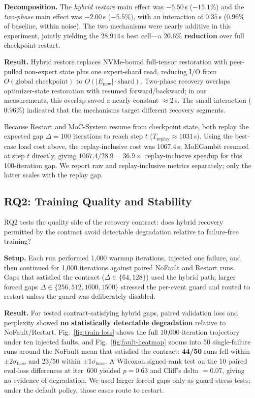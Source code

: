 \documentclass[10pt,conference]{IEEEtran}
\begin{document}
\textbf{Decomposition.} The \emph{hybrid restore} main effect was $-5.50$\,s ($-15.1\%$) and the \emph{two-phase} main effect was $-2.00$\,s ($-5.5\%$), with an interaction of $0.35$\,s ($0.96\%$ of baseline, within noise). The two mechanisms were nearly additive in this experiment, jointly yielding the $28.914$\,s best cell---a \textbf{$20.6\%$ reduction} over full checkpoint restart.

\textbf{Result.} Hybrid restore replaces NVMe-bound full-tensor restoration with peer-pulled non-expert state plus one expert-shard read, reducing I/O from $O(\text{global checkpoint})$ to $O(|E_{\text{new}}|\!\cdot\!\text{shard})$. Two-phase recovery overlaps optimizer-state restoration with resumed forward/backward; in our measurements, this overlap saved a nearly constant $\approx 2$\,s. The small interaction ($0.96\%$) indicated that the mechanisms target different recovery segments.

Because Restart and MoC-System resume from checkpoint state, both replay the expected gap $\Delta\!=\!100$ iterations to reach step $t$ ($T_{\text{replay}}\!\approx\!1031$\,s). Using the best-case load cost above, the replay-inclusive cost was $1067.4$\,s; MoEGambit resumed at step $t$ directly, giving $1067.4/28.9=\mathbf{36.9\times}$ replay-inclusive speedup for this 100-iteration gap. We report raw and replay-inclusive metrics separately; only the latter scales with the replay gap.

\subsection{RQ2: Training Quality and Stability}
\label{sec:rq2}

RQ2 tests the quality side of the recovery contract: does hybrid recovery permitted by the contract avoid detectable degradation relative to failure-free training?

\textbf{Setup.} Each run performed 1{,}000 warmup iterations, injected one failure, and then continued for 1{,}000 iterations against paired NoFault and Restart runs. Gaps that satisfied the contract ($\Delta\!\in\!\{64,128\}$) used the hybrid path; larger forced gaps $\Delta\!\in\!\{256,512,1000,1500\}$ stressed the per-event guard and routed to restart unless the guard was deliberately disabled.

\textbf{Result.} For tested contract-satisfying hybrid gaps, paired validation loss and perplexity showed \textbf{no statistically detectable degradation} relative to NoFault/Restart. Fig.~\ref{fig:train-loss} shows the full 10{,}000-iteration trajectory under ten injected faults, and Fig.~\ref{fig:fault-heatmap} zooms into 50 single-failure runs around the NoFault mean that satisfied the contract: \textbf{44/50} runs fell within $\pm2\sigma_{\text{base}}$ and 23/50 within $\pm1\sigma_{\text{base}}$. A Wilcoxon signed-rank test on the 10 paired eval-loss differences at iter~600 yielded $p\!=\!0.63$ and Cliff's delta $=0.07$, giving no evidence of degradation. We used larger forced gaps only as guard stress tests; under the default policy, those cases route to restart.
\end{document}
